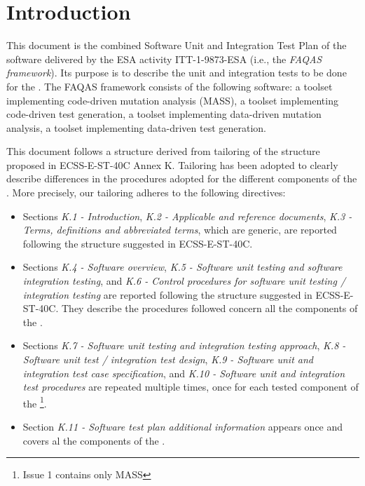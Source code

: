 
\chapter{Introduction}

This document is the combined Software Unit and Integration Test Plan of the software delivered by the ESA activity ITT-1-9873-ESA (i.e., the \emph{FAQAS framework}). Its purpose is to describe the unit and integration tests to be done for the \FAQAS.
The FAQAS framework consists of the following software: a toolset  implementing code-driven mutation analysis (MASS), a toolset implementing code-driven test generation, a toolset implementing data-driven mutation analysis, a toolset implementing data-driven test generation.

This document follows a structure derived from tailoring of the structure proposed in ECSS-E-ST-40C Annex K. Tailoring has been adopted to clearly describe differences in the procedures adopted for the different components of the \FAQAS. More precisely, our tailoring adheres to the following directives:

\begin{itemize}
\item Sections 
\emph{K.1 - Introduction}, 
\emph{K.2 - Applicable and reference documents}, 
\emph{K.3 - Terms, definitions and abbreviated terms}, which are generic, are reported following the structure suggested in ECSS-E-ST-40C. 

\item Sections \emph{K.4 - Software overview}, \emph{K.5 - Software unit testing and software integration testing}, 
 and \emph{K.6 - Control procedures for software unit testing / integration testing} are reported following the structure suggested in ECSS-E-ST-40C. They describe the procedures followed concern all the components of the \FAQAS.
 
\item Sections \emph{K.7 - Software unit testing and integration testing approach}, 
\emph{K.8 - Software unit test / integration test design},
 \emph{K.9 - Software unit and integration test case specification},
 and \emph{K.10 - Software unit and integration test procedures} are repeated multiple times, once for each tested component of the \FAQAS\footnote{Issue 1 contains only MASS}. 
 
\item Section \emph{K.11 - Software test plan additional information} appears once and covers al the components of the \FAQAS.
\end{itemize}
 
